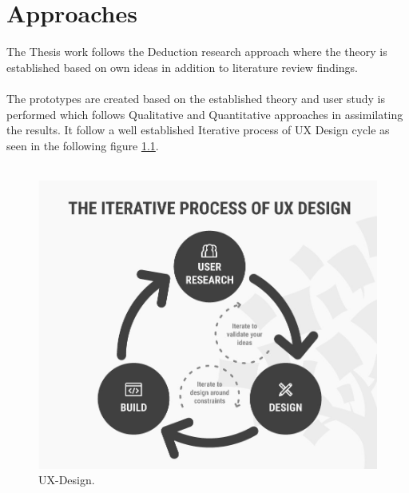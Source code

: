 \chapter{Approaches}
\label{ch:approaches}

The Thesis work follows the Deduction research approach where the theory is established based on own ideas in addition to literature review findings. \\ \\

The prototypes are created based on the established theory and user study is performed which follows Qualitative and Quantitative approaches in assimilating the results. It follow a well established Iterative process of UX Design cycle as seen in the following figure \ref{fig:ux-design}. \\ \\  


\begin{figure}[hbt!]
	\centering
	\includegraphics[width=\linewidth]{figures/ux-design}
	\caption{UX-Design.}
	\label{fig:ux-design}
\end{figure}